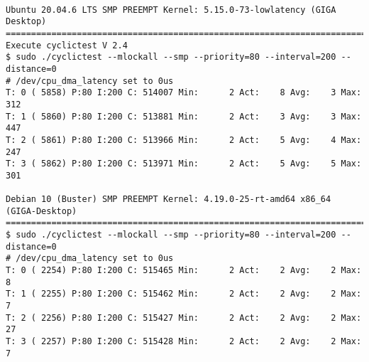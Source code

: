 \clearpage
\pagebreak
\begin{landscape}
	
\begin{lstlisting}[caption={App Realtime Latency Test for GIGA Desktop}, label=App Realtime Latency Test for GIGA Desktop]	

Ubuntu 20.04.6 LTS SMP PREEMPT Kernel: 5.15.0-73-lowlatency (GIGA Desktop)
================================================================================
Execute cyclictest V 2.4
$ sudo ./cyclictest --mlockall --smp --priority=80 --interval=200 --distance=0
# /dev/cpu_dma_latency set to 0us
T: 0 ( 5858) P:80 I:200 C: 514007 Min:      2 Act:    8 Avg:    3 Max:     312
T: 1 ( 5860) P:80 I:200 C: 513881 Min:      2 Act:    3 Avg:    3 Max:     447
T: 2 ( 5861) P:80 I:200 C: 513966 Min:      2 Act:    5 Avg:    4 Max:     247
T: 3 ( 5862) P:80 I:200 C: 513971 Min:      2 Act:    5 Avg:    5 Max:     301

Debian 10 (Buster) SMP PREEMPT Kernel: 4.19.0-25-rt-amd64 x86_64 (GIGA-Desktop)
================================================================================
$ sudo ./cyclictest --mlockall --smp --priority=80 --interval=200 --distance=0
# /dev/cpu_dma_latency set to 0us
T: 0 ( 2254) P:80 I:200 C: 515465 Min:      2 Act:    2 Avg:    2 Max:       8
T: 1 ( 2255) P:80 I:200 C: 515462 Min:      2 Act:    2 Avg:    2 Max:       7
T: 2 ( 2256) P:80 I:200 C: 515427 Min:      2 Act:    2 Avg:    2 Max:      27
T: 3 ( 2257) P:80 I:200 C: 515428 Min:      2 Act:    2 Avg:    2 Max:       7
\end{lstlisting}

\end{landscape}


